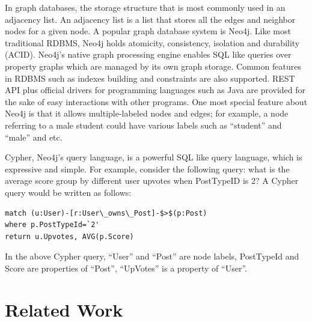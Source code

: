 In graph databases, the storage structure that is most commonly used in an adjacency list. An adjacency list is a list that stores all the edges and neighbor nodes for a given node. A popular graph database system is Neo4j. Like most traditional RDBMS, Neo4j holds atomicity, consistency, isolation and durability (ACID). Neo4j's native graph processing engine enables SQL like queries over property graphs which are managed by its own graph storage. Common features in RDBMS such as indexes building and constraints are also supported. REST API plus official drivers for programming languages such as Java are provided for the sake of easy interactions with other programs. One most special feature about Neo4j is that it allows multiple-labeled nodes and edges; for example, a node referring to a male student could have various labels such as ``student'' and ``male'' and etc.

Cypher, Neo4j's query language, is a powerful SQL like query language, which is expressive and simple. For example, consider the following query: what is the average score group by different user upvotes when PostTypeID is 2? A Cypher query would be written as follows:

\begin{verbatim}
match (u:User)-[r:User\_owns\_Post]-$>$(p:Post)
where p.PostTypeId=`2'
return u.Upvotes, AVG(p.Score)
\end{verbatim}

In the above Cypher query, ``User'' and ``Post'' are node labels, PostTypeId and Score are properties of ``Post'', ``UpVotes'' is a property of ``User''.


%


\section{Related Work}



